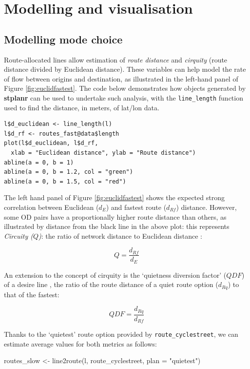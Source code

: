 \section{Modelling and visualisation}\label{modelling-and-visualisation}

\subsection{Modelling mode choice}\label{modelling-mode-choice}

Route-allocated lines allow estimation of \emph{route distance} and
\emph{cirquity} (route distance divided by Euclidean distance). These
variables can help model the rate of flow between origins and
destination, as illustrated in the left-hand panel of Figure
\ref{fig:euclidfastest}. The code below demonstrates how objects
generated by \textbf{stplanr} can be used to undertake such analysis,
with the \texttt{line\_length} function used to find the distance, in
meters, of lat/lon data.

\begin{verbatim}
l$d_euclidean <- line_length(l)
l$d_rf <- routes_fast@data$length
plot(l$d_euclidean, l$d_rf,
  xlab = "Euclidean distance", ylab = "Route distance")
abline(a = 0, b = 1)
abline(a = 0, b = 1.2, col = "green")
abline(a = 0, b = 1.5, col = "red")
\end{verbatim}

The left hand panel of Figure \ref{fig:euclidfastest} shows the expected
strong correlation between Euclidean (\(d_E\)) and fastest route
(\(d_{Rf}\)) distance. However, some OD pairs have a proportionally
higher route distance than others, as illustrated by distance from the
black line in the above plot: this represents \emph{Circuity ($Q$)}: the
ratio of network distance to Euclidean distance
\citep{levinson_minimum_2009}:

\[
 Q = \frac{d_{Rf}}{d_E}
\]

An extension to the concept of cirquity is the `quietness diversion
factor' (\(QDF\)) of a desire line \citep{lovelace_propensity_2017}, the
ratio of the route distance of a quiet route option (\(d_{Rq}\)) to that
of the fastest:

\[
 QDF = \frac{d_{Rq}}{d_{Rf}}
\]

Thanks to the `quietest' route option provided by
\texttt{route\_cyclestreet}, we can estimate average values for both
metrics as follows:

\begin{Schunk}
\begin{Sinput}
routes_slow <- line2route(l, route_cyclestreet, plan = "quietest")
\end{Sinput}
\end{Schunk}

